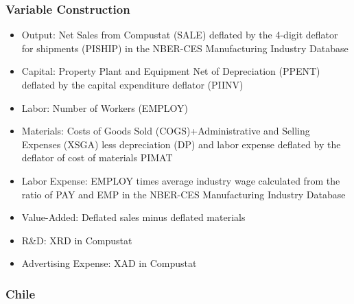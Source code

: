 \documentclass[11pt]{article}
\begin{document}
\subsubsection*{Variable Construction}
\begin{itemize}
	\item Output: Net Sales from Compustat (SALE) deflated by the 4-digit deflator for shipments (PISHIP) in the NBER-CES Manufacturing Industry Database
	\item Capital: Property Plant and Equipment Net of Depreciation (PPENT) deflated by the capital expenditure deflator (PIINV)
	\item Labor: Number of Workers (EMPLOY)
	\item Materials: Costs of Goods Sold (COGS)+Administrative and Selling Expenses (XSGA) less depreciation (DP) and labor expense deflated by the deflator of cost of materials PIMAT
	\item Labor Expense: EMPLOY times average industry wage calculated from the ratio of PAY and EMP in the NBER-CES Manufacturing Industry Database
	\item Value-Added: Deflated sales minus deflated materials
	\item R\&D: XRD in Compustat
	\item Advertising Expense: XAD in Compustat
\end{itemize}

\subsubsection{Chile}
\end{document}
